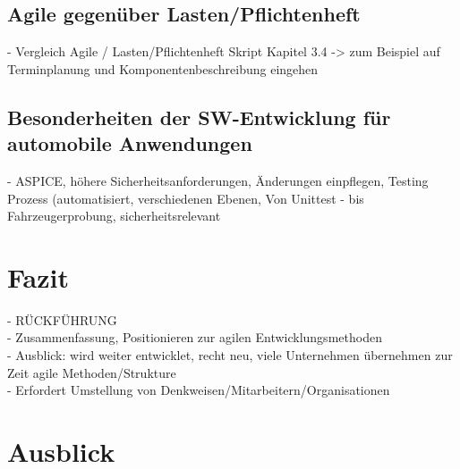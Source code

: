\subsection{Agile gegenüber Lasten/Pflichtenheft}
- Vergleich Agile / Lasten/Pflichtenheft Skript Kapitel 3.4 -> zum Beispiel auf Terminplanung und Komponentenbeschreibung eingehen\\

\subsection{Besonderheiten der SW-Entwicklung für automobile Anwendungen}
- ASPICE, höhere Sicherheitsanforderungen, Änderungen einpflegen, Testing Prozess (automatisiert, verschiedenen Ebenen, Von Unittest - bis Fahrzeugerprobung, sicherheitsrelevant\\

\section{Fazit}
- RÜCKFÜHRUNG\\
- Zusammenfassung, Positionieren zur agilen Entwicklungsmethoden \\
- Ausblick: wird weiter entwicklet, recht neu, viele Unternehmen übernehmen zur Zeit agile Methoden/Strukture \\
- Erfordert Umstellung von Denkweisen/Mitarbeitern/Organisationen\\
\section{Ausblick}